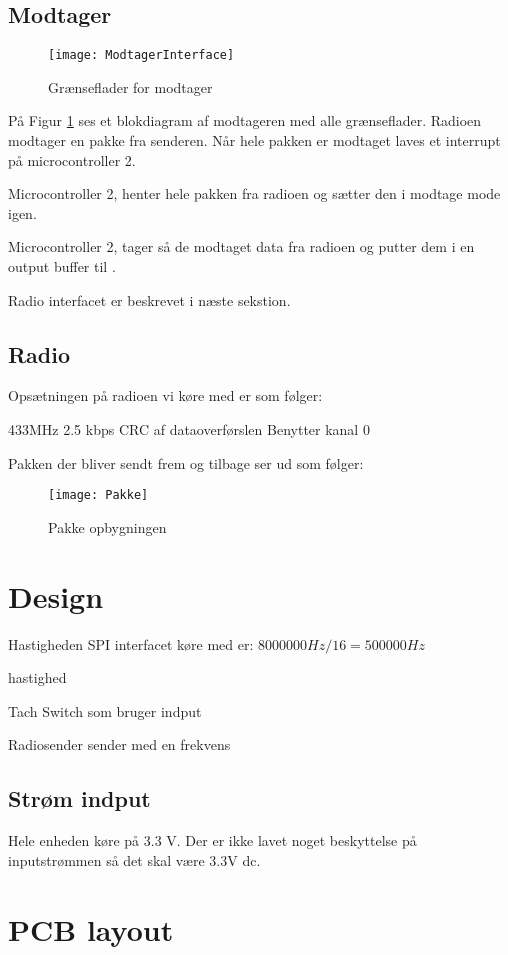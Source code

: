 \documentclass[Main]{subfiles}
\begin{document}
\subsection{Modtager}

\begin{figure}[H]
\centering
\texttt{[image: ModtagerInterface]}
\caption{Grænseflader for modtager}
\label{fig: ModtagerInterface}
\end{figure}
På Figur \ref{fig: ModtagerInterface} ses et blokdiagram af modtageren med alle grænseflader.
Radioen modtager en pakke fra senderen. Når hele pakken er modtaget laves et interrupt på microcontroller 2.

Microcontroller 2, henter hele pakken fra radioen og sætter den i modtage mode igen. 

Microcontroller 2, tager så de modtaget data fra radioen og putter dem i en output buffer til \itoc.

Radio interfacet er beskrevet i næste sekstion.


\subsection{Radio}
Opsætningen på radioen vi køre med er som følger:

433MHz
2.5 kbps
CRC af dataoverførslen
Benytter kanal 0

Pakken der bliver sendt frem og tilbage ser ud som følger:
\begin{figure}[H]
\centering
\texttt{[image: Pakke]}
\caption{Pakke opbygningen}
\label{fig: Pakke}
\end{figure}
\section{Design}

Hastigheden SPI interfacet køre med er:
$ 8000000Hz/16 = 500000Hz $

\itoc hastighed

Tach Switch som bruger indput

Radiosender sender med en frekvens 

\subsection{Strøm indput}

Hele enheden køre på 3.3 V.
Der er ikke lavet noget beskyttelse på inputstrømmen så det skal være 3.3V dc.

\section{PCB layout}
\end{document}
